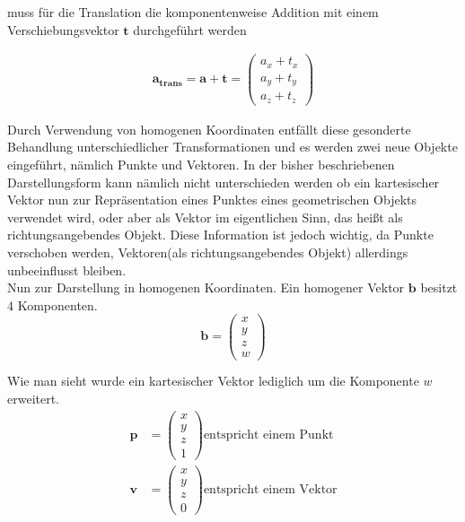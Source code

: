 muss für die Translation die komponentenweise Addition mit einem Verschiebungsvektor $\mathbf{t}$ durchgeführt werden

\begin{align*}
    \mathbf{a_{trans}} = \mathbf{a} + \mathbf{t} = \begin{pmatrix} a_x + t_x \\ a_y + t_y \\ a_z + t_z
                                                   \end{pmatrix}
\end{align*}

Durch Verwendung von homogenen Koordinaten entfällt diese gesonderte Behandlung unterschiedlicher
Transformationen und es werden zwei neue Objekte eingeführt, nämlich Punkte und Vektoren. In der
bisher beschriebenen Darstellungsform kann nämlich nicht unterschieden werden ob ein kartesischer Vektor nun
zur Repräsentation eines Punktes eines geometrischen Objekts verwendet wird, oder aber als Vektor im eigentlichen
Sinn, das heißt als richtungsangebendes Objekt. Diese Information ist jedoch wichtig, da Punkte verschoben werden, Vektoren(als richtungsangebendes Objekt) allerdings unbeeinflusst bleiben.\\

Nun zur Darstellung in homogenen Koordinaten. Ein homogener Vektor $\mathbf{b}$ besitzt 4 Komponenten.
\begin{equation*}
    \mathbf{b} = \begin{pmatrix} x \\ y \\ z \\ w   \end{pmatrix}
\end{equation*}

 Wie man sieht wurde ein kartesischer Vektor lediglich um die Komponente $w$ erweitert. 
\begin{align*}
    \mathbf{p}& = \begin{pmatrix} x \\ y \\ z \\ 1  \end{pmatrix} \text{entspricht einem Punkt}\\
    \mathbf{v}& = \begin{pmatrix} x \\ y \\ z \\ 0  \end{pmatrix} \text{entspricht einem Vektor}\\
\end{align*}

